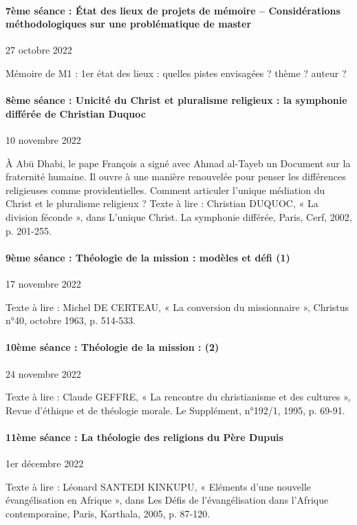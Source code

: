\paragraph{7ème séance : État des lieux de projets de mémoire – Considérations méthodologiques sur une problématique de master}    27 octobre 2022 


Mémoire de M1 : 1er état des lieux : quelles pistes envisagées ? thème ? auteur ?  
 
\paragraph{8ème séance : Unicité du Christ et pluralisme religieux : la symphonie différée de Christian Duquoc}    10 novembre 2022


 À Abū Dhabi, le pape François a signé avec Ahmad al-Tayeb un Document sur la fraternité humaine. Il ouvre à une manière renouvelée pour penser les différences religieuses comme providentielles. Comment articuler l’unique médiation du Christ et le pluralisme religieux ? 
Texte à lire : Christian DUQUOC, « La division féconde », dans L’unique Christ. La symphonie différée, Paris, Cerf, 2002, p. 201-255. 
\paragraph{9ème séance : Théologie de la mission : modèles et défi (1)}    17 novembre 2022


Texte à lire : Michel DE CERTEAU, « La conversion du missionnaire », Christus n°40, octobre 1963, p. 514-533.
\paragraph{10ème séance : Théologie de la mission :  (2)}    24 novembre 2022


Texte à lire : Claude GEFFRE, « La rencontre du christianisme et des cultures », Revue d’éthique et de théologie morale. Le Supplément, n°192/1, 1995, p. 69-91. 


\paragraph{11ème séance : La théologie des religions du Père Dupuis}   1er décembre 2022


Texte à lire : Léonard SANTEDI KINKUPU, « Eléments d’une nouvelle évangélisation en Afrique », dans Les Défis de l’évangélisation dans l’Afrique contemporaine, Paris, Karthala, 2005, p. 87-120.




